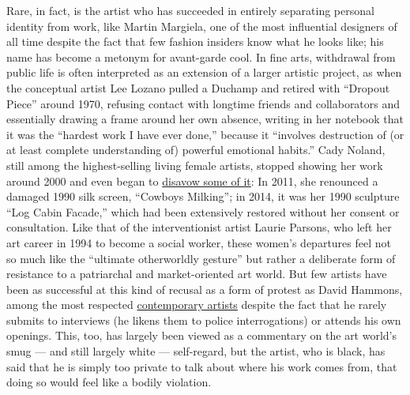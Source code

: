 Rare, in fact, is the artist who has succeeded in entirely separating
personal identity from work, like Martin Margiela, one of the most
influential designers of all time despite the fact that few fashion
insiders know what he looks like; his name has become a metonym for
avant-garde cool. In fine arts, withdrawal from public life is often
interpreted as an extension of a larger artistic project, as when the
conceptual artist Lee Lozano pulled a Duchamp and retired with ``Dropout
Piece'' around 1970, refusing contact with longtime friends and
collaborators and essentially drawing a frame around her own absence,
writing in her notebook that it was the ``hardest work I have ever
done,'' because it ``involves destruction of (or at least complete
understanding of) powerful emotional habits.'' Cady Noland, still among
the highest-selling living female artists, stopped showing her work
around 2000 and even began to
\href{https://www.nytimes.com/2019/03/11/t-magazine/artists-destroy-past-work.html}{disavow
some of it}: In 2011, she renounced a damaged 1990 silk screen,
``Cowboys Milking''; in 2014, it was her 1990 sculpture ``Log Cabin
Facade,'' which had been extensively restored without her consent or
consultation. Like that of the interventionist artist Laurie Parsons,
who left her art career in 1994 to become a social worker, these women's
departures feel not so much like the ``ultimate otherworldly gesture''
but rather a deliberate form of resistance to a patriarchal and
market-oriented art world. But few artists have been as successful at
this kind of recusal as a form of protest as David Hammons, among the
most respected
\href{https://www.nytimes.com/2019/07/15/t-magazine/most-important-contemporary-art.html}{contemporary
artists} despite the fact that he rarely submits to interviews (he
likens them to police interrogations) or attends his own openings. This,
too, has largely been viewed as a commentary on the art world's smug ---
and still largely white --- self-regard, but the artist, who is black,
has said that he is simply too private to talk about where his work
comes from, that doing so would feel like a bodily violation.


